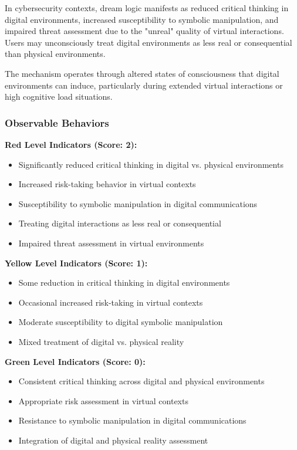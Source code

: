 \documentclass[11pt,a4paper]{article}
\begin{document}
In cybersecurity contexts, dream logic manifests as reduced critical thinking in digital environments, increased susceptibility to symbolic manipulation, and impaired threat assessment due to the "unreal" quality of virtual interactions. Users may unconsciously treat digital environments as less real or consequential than physical environments.

The mechanism operates through altered states of consciousness that digital environments can induce, particularly during extended virtual interactions or high cognitive load situations\cite{reid2007}.

\subsubsection{Observable Behaviors}

\textbf{Red Level Indicators (Score: 2):}
\begin{itemize}
\item Significantly reduced critical thinking in digital vs. physical environments
\item Increased risk-taking behavior in virtual contexts
\item Susceptibility to symbolic manipulation in digital communications
\item Treating digital interactions as less real or consequential
\item Impaired threat assessment in virtual environments
\end{itemize}

\textbf{Yellow Level Indicators (Score: 1):}
\begin{itemize}
\item Some reduction in critical thinking in digital environments
\item Occasional increased risk-taking in virtual contexts
\item Moderate susceptibility to digital symbolic manipulation
\item Mixed treatment of digital vs. physical reality
\end{itemize}

\textbf{Green Level Indicators (Score: 0):}
\begin{itemize}
\item Consistent critical thinking across digital and physical environments
\item Appropriate risk assessment in virtual contexts
\item Resistance to symbolic manipulation in digital communications
\item Integration of digital and physical reality assessment
\end{itemize}
\end{document}
